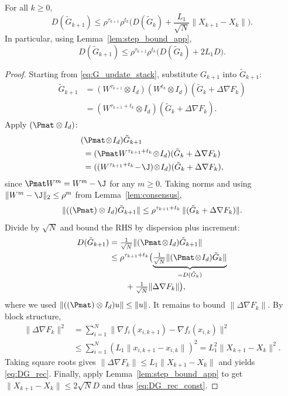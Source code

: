 \documentclass[review,onefignum,onetabnum]{siamart171218}
\begin{document}
	\begin{lemma}\label{lem:DG_rec}
		For all $k\ge0$,
		\begin{equation}\label{eq:DG_rec}
			D(\tilde G_{k+1})
			\le \rho^{\tau_{k+1}}\rho^{t_k}\Big(D(\tilde G_k)+\frac{L_1}{\sqrt N}\|X_{k+1}-X_k\|\Big).
		\end{equation}
		In particular, using Lemma~\ref{lem:step_bound_app},
		\begin{equation}\label{eq:DG_rec_const}
			D(\tilde G_{k+1})
			\le \rho^{\tau_{k+1}}\rho^{t_k}\Big(D(\tilde G_k)+2L_1D\Big).
		\end{equation}
	\end{lemma}
	\begin{proof}
		Starting from \eqref{eq:G_update_stack}, substitute $G_{k+1}$ into $\tilde G_{k+1}$:
		\begin{align*}
			\tilde G_{k+1}
			&=(W^{\tau_{k+1}}\!\otimes\! I_d)(W^{t_k}\!\otimes\! I_d)(\tilde G_k\!+\!\Delta\nabla F_k)\\
			&=(W^{\tau_{k+1}+t_k}\!\otimes\! I_d)(\tilde G_k\!+\!\Delta\nabla F_k).
		\end{align*}
		Apply $(\Pmat\otimes I_d)$:
		\begin{align*}
			&(\Pmat\!\otimes\! I_d)\tilde G_{k+1}\\
			&\;=(\Pmat W^{\tau_{k+1}+t_k}\!\otimes\! I_d)(\tilde G_k+\Delta\nabla F_k)\\
			&\;=((W^{\tau_{k+1}+t_k}\!-\!\J)\!\otimes\! I_d)(\tilde G_k+\Delta\nabla F_k),
		\end{align*}
		since $\Pmat W^m=W^m-\J$ for any $m\ge0$.
		Taking norms and using $\|W^{m}-\J\|_2\le \rho^{m}$ from Lemma~\ref{lem:consensus},
		\[
		\|((\Pmat)\otimes I_d)\tilde G_{k+1}\|
		\le \rho^{\tau_{k+1}+t_k}\,\|(\tilde G_k+\Delta\nabla F_k)\|.
		\]
		Divide by $\sqrt N$ and bound the RHS by dispersion plus increment:
		\begin{align*}
			D(\tilde G_{k+1})
			&=\tfrac1{\sqrt N}\|(\Pmat\!\otimes\! I_d)\tilde G_{k+1}\|\\
			&\le \rho^{\tau_{k+1}+t_k}\bigl(
			\underbrace{\tfrac1{\sqrt N}\|(\Pmat\!\otimes\! I_d)\tilde G_k\|}_{=D(\tilde G_k)}\\
			&\qquad+\tfrac1{\sqrt N}\|\Delta\nabla F_k\|\bigr),
		\end{align*}
		where we used $\|((\Pmat)\otimes I_d)u\|\le \|u\|$.
		It remains to bound $\|\Delta\nabla F_k\|$.
		By block structure,
		\begin{align*}
			\|\Delta\nabla F_k\|^2
			&=\textstyle\sum_{i=1}^N\|\nabla f_i(x_{i,k+1})\!-\!\nabla f_i(x_{i,k})\|^2\\
			&\le \textstyle\sum_{i=1}^N (L_1\|x_{i,k+1}\!-\!x_{i,k}\|)^2
			=L_1^2\|X_{k+1}\!-\!X_k\|^2.
		\end{align*}
		Taking square roots gives $\|\Delta\nabla F_k\|\le L_1\|X_{k+1}-X_k\|$ and yields \eqref{eq:DG_rec}.
		Finally, apply Lemma~\ref{lem:step_bound_app} to get $\|X_{k+1}-X_k\|\le 2\sqrt N D$ and thus \eqref{eq:DG_rec_const}.
	\end{proof}
	
\end{document}
